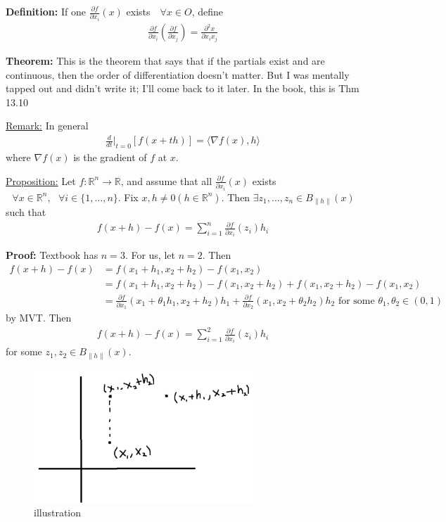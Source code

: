 \documentclass{article}
\newcommand*{\txt}[1]{\text{ #1 }}%
\newcommand*{\iprod}[1]{\langle #1 \rangle}
\newcommand*{\fora}{\txt{}\forall}%
\newcommand*{\rr}{\mathbb{R}}%
\begin{document}
\textbf{Definition:} If one $\frac{\partial f}{\partial x_i}(x)$ exists $\fora x\in O$, define \begin{align*}
    \frac{\partial f}{\partial x_i}(\frac{\partial f}{\partial x_j})=\frac{\partial^2 x}{\partial x_i x_j}
\end{align*}

\textbf{Theorem:} \* This is the theorem that says that if the partials exist and are continuous, then the order of differentiation doesn't matter. But I was mentally tapped out and didn't write it; I'll come back to it later. In the book, this is Thm 13.10 \*

\underline{Remark:} In general \begin{align*}
    \frac{d}{dt}|_{t=0}[f(x+th)]=\iprod{\nabla f(x),h}
\end{align*} where $\nabla f(x)$ is the gradient of $f$ at $x$.

\underline{Proposition:} Let $f:\rr^n\to\rr$, and assume that all $\frac{\partial f}{\partial x_i}(x)$ exists $\fora x\in \rr^n,\fora i\in \{1,\dots,n\}$. Fix $x, h\neq 0 (h\in \rr^n)$. Then $\exists z_1,\dots,z_n\in B_{\|h\|}(x)$ such that \begin{align*}
    f(x+h)-f(x)=\sum_{i=1}^{n}\frac{\partial f}{\partial x_i}(z_i)h_i
\end{align*}

\textbf{Proof:} Textbook has $n=3$. For us, let $n=2$. Then \begin{align*}
    f(x+h)-f(x)&=f(x_1+h_1,x_2+h_2)-f(x_1,x_2)\\
    &=f(x_1+h_1,x_2+h_2)-f(x_1,x_2+h_2)+f(x_1,x_2+h_2)-f(x_1,x_2)\\
    &=\frac{\partial f}{\partial x_1}(x_1+\theta_1 h_1,x_2+h_2)h_1+\frac{\partial f}{\partial x_2}(x_1,x_2+\theta_2 h_2)h_2\txt{for some}\theta_1,\theta_2\in (0,1)
\end{align*} by MVT. Then \begin{align*}
    f(x+h)-f(x)=\sum_{i=1}^{2}\frac{\partial f}{\partial x_i}(z_i)h_i
\end{align*} for some $z_1,z_2\in B_{\|h\|}(x)$.

\begin{figure}[H]
    \centering
    \includegraphics[height=5cm]{fig2.png}
    \caption{illustration}
    \label{fig:fig2}
\end{figure}
\end{document}
